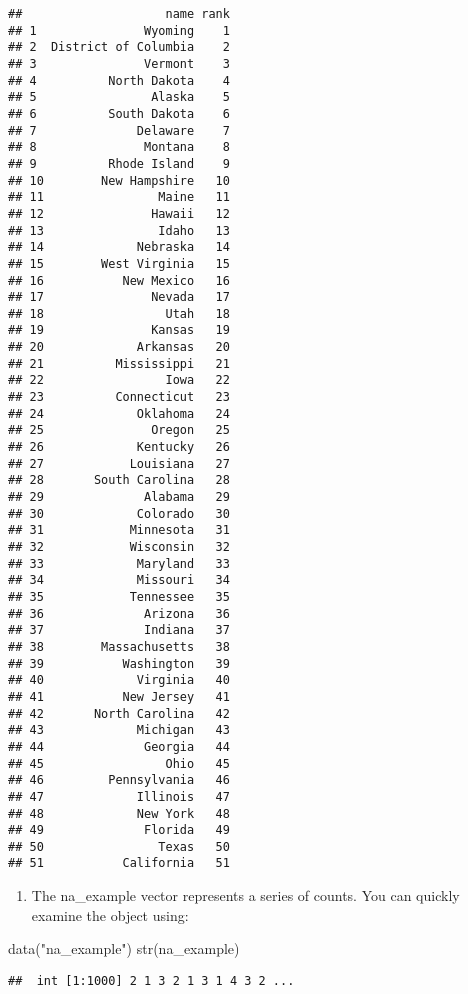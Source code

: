 \documentclass[
]{article}
\newenvironment{Shaded}{\begin{snugshade}}{\end{snugshade}}
\newcommand{\FunctionTok}[1]{\textcolor[rgb]{0.00,0.00,0.00}{#1}}
\newcommand{\NormalTok}[1]{#1}
\newcommand{\StringTok}[1]{\textcolor[rgb]{0.31,0.60,0.02}{#1}}
\providecommand{\tightlist}{%
  \setlength{\itemsep}{0pt}\setlength{\parskip}{0pt}}
\begin{document}
\begin{verbatim}
##                    name rank
## 1               Wyoming    1
## 2  District of Columbia    2
## 3               Vermont    3
## 4          North Dakota    4
## 5                Alaska    5
## 6          South Dakota    6
## 7              Delaware    7
## 8               Montana    8
## 9          Rhode Island    9
## 10        New Hampshire   10
## 11                Maine   11
## 12               Hawaii   12
## 13                Idaho   13
## 14             Nebraska   14
## 15        West Virginia   15
## 16           New Mexico   16
## 17               Nevada   17
## 18                 Utah   18
## 19               Kansas   19
## 20             Arkansas   20
## 21          Mississippi   21
## 22                 Iowa   22
## 23          Connecticut   23
## 24             Oklahoma   24
## 25               Oregon   25
## 26             Kentucky   26
## 27            Louisiana   27
## 28       South Carolina   28
## 29              Alabama   29
## 30             Colorado   30
## 31            Minnesota   31
## 32            Wisconsin   32
## 33             Maryland   33
## 34             Missouri   34
## 35            Tennessee   35
## 36              Arizona   36
## 37              Indiana   37
## 38        Massachusetts   38
## 39           Washington   39
## 40             Virginia   40
## 41           New Jersey   41
## 42       North Carolina   42
## 43             Michigan   43
## 44              Georgia   44
## 45                 Ohio   45
## 46         Pennsylvania   46
## 47             Illinois   47
## 48             New York   48
## 49              Florida   49
## 50                Texas   50
## 51           California   51
\end{verbatim}

\begin{enumerate}
\def\labelenumi{\arabic{enumi}.}
\setcounter{enumi}{6}
\tightlist
\item
  The na\_example vector represents a series of counts. You can quickly
  examine the object using:
\end{enumerate}

\begin{Shaded}
\begin{Highlighting}[]
\FunctionTok{data}\NormalTok{(}\StringTok{"na\_example"}\NormalTok{)  }
\FunctionTok{str}\NormalTok{(na\_example)}
\end{Highlighting}
\end{Shaded}

\begin{verbatim}
##  int [1:1000] 2 1 3 2 1 3 1 4 3 2 ...
\end{verbatim}
\end{document}
